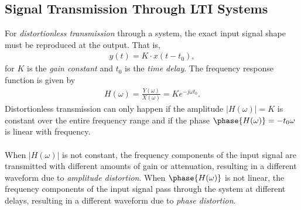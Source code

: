 \documentclass{report}
\begin{document}
\subsection{Signal Transmission Through LTI Systems}
For \emph{distortionless transmission} through a system, the exact input signal shape must be reproduced at the output. That is, 
\begin{align}
    y(t) = K\cdot x(t-t_0),
\end{align} 
for $K$ is the \emph{gain constant} and $t_0$ is the \emph{time delay}. The frequency response function is given by 
\begin{align}
    H(\omega) = \frac{Y(\omega)}{X(\omega)} = Ke^{-j\omega t_0}.
\end{align}
Distortionless transmission can only happen if the amplitude $|H(\omega)|=K$ is constant over the entire frequency range and if the phase $\phase{H(\omega)} = -t_0 \omega$ 
is linear with frequency.
\\ \\
When $|H(\omega)|$ is not constant, the frequency components of the input signal are transmitted with different amounts of gain or attenuation, resulting in a different waveform due to \emph{amplitude distortion}. 
When $\phase{H(\omega)}$ is not linear, the frequency components of the input signal pass through the system at different delays, resulting in a different waveform due to \emph{phase distortion}. 
\end{document}
